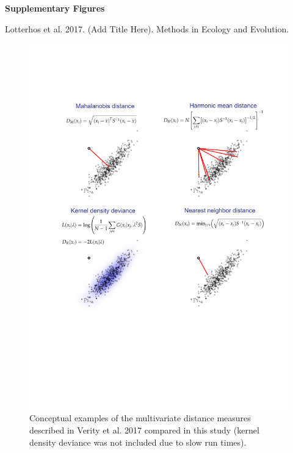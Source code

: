 \documentclass[12pt, oneside]{amsart}
\begin{document}


{ \Large \bf Supplementary Figures}

Lotterhos et al. 2017. (Add Title Here). Methods in Ecology and Evolution.

\hspace{3cm}


\renewcommand{\figurename}{Supplementary Figure}

\begin{figure}[h]
\begin{center}
\includegraphics[width=6in]{../figures_man2/S1-bivariate.pdf}
\end{center}
\caption[]{Conceptual examples of the multivariate distance measures described in Verity et al. 2017  compared in this study (kernel density deviance was not included due to slow run times).}
 \label{fig:???}
\end{figure}
\end{document}
